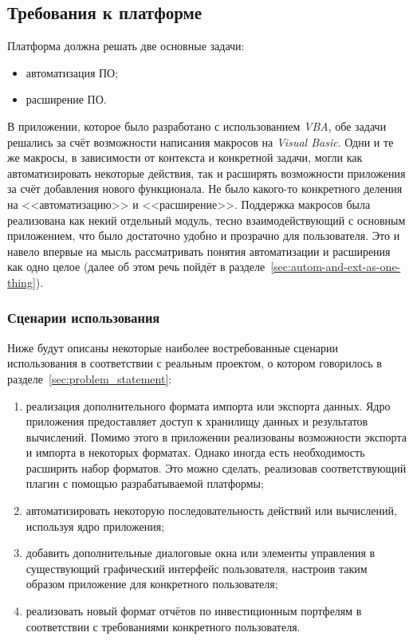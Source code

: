 \subsection{Требования к платформе}
\label{sec:pl_requirements}

Платформа должна решать две основные задачи:
\begin{itemize}
 \item автоматизация ПО;
 \item расширение ПО.
\end{itemize}

В приложении, которое было разработано с использованием {\it VBA}, обе задачи решались за счёт возможности написания макросов на {\it Visual Basic}. Одни и те же макросы, в зависимости от контекста и конкретной задачи, могли как автоматизировать некоторые действия, так и расширять возможности приложения за счёт добавления нового функционала. Не было какого-то конкретного деления на <<автоматизацию>> и <<расширение>>. Поддержка макросов была реализована как некий отдельный модуль, тесно взаимодействующий с основным приложением, что было достаточно удобно и прозрачно для пользователя. Это и навело впервые на мысль рассматривать понятия автоматизации и расширения как одно целое (далее об этом речь пойдёт в разделе~\ref{sec:autom-and-ext-as-one-thing}).

\subsubsection{Сценарии использования}
Ниже будут описаны некоторые наиболее востребованные сценарии использования в соответствии с реальным проектом, о котором говорилось в разделе~\ref{sec:problem_statement}:
\begin{enumerate}
 \item реализация дополнительного формата импорта или экспорта данных. Ядро приложения предоставляет доступ к хранилищу данных и результатов вычислений. Помимо этого в приложении реализованы возможности экспорта и импорта в некоторых форматах. Однако иногда есть необходимость расширить набор форматов. Это можно сделать, реализовав соответствующий плагин с помощью разрабатываемой платформы;
 \item автоматизировать некоторую последовательность действий или вычислений, используя ядро приложения;
 \item добавить дополнительные диалоговые окна или элементы управления в существующий графический интерфейс пользователя, настроив таким образом приложение для конкретного пользователя;
 \item реализовать новый формат отчётов по инвестиционным портфелям в соответствии с требованиями конкретного пользователя.
\end{enumerate}

